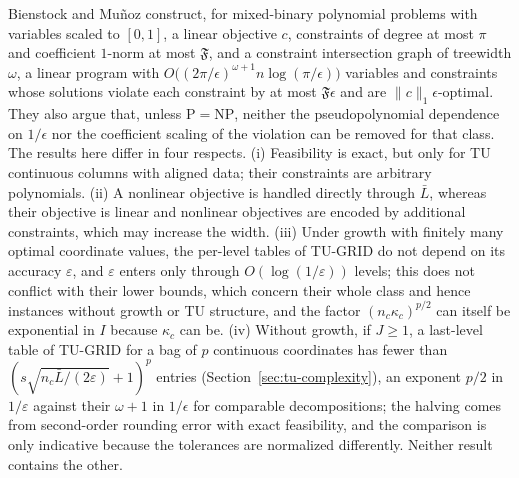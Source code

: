 \begin{remark}\label{rem:tu-bm}
Bienstock and Mu\~noz \cite[Theorems~4 and~15]{BienstockMunoz2018} construct,
for mixed-binary polynomial problems with variables scaled to $[0,1]$, a linear
objective $c$, constraints of degree at most $\pi$ and coefficient $1$-norm at
most $\mathfrak F$, and a constraint intersection graph of treewidth $\omega$, a
linear program with $O\bigl((2\pi/\epsilon)^{\omega+1}n\log(\pi/\epsilon)\bigr)$
variables and constraints whose solutions violate each constraint by at most
$\mathfrak F\epsilon$ and are $\lVert c\rVert_1\epsilon$-optimal. They also argue that,
unless $\mathrm P=\mathrm{NP}$, neither the pseudopolynomial dependence on
$1/\epsilon$ nor the coefficient scaling of the violation can be removed for that
class. The results here differ in four respects. (i) Feasibility is exact, but
only for TU continuous columns with aligned data; their constraints are
arbitrary polynomials. (ii) A nonlinear objective is handled directly through
$\bar L$, whereas their objective is linear and nonlinear objectives are
encoded by additional constraints, which may increase the width. (iii) Under
growth with finitely many optimal coordinate values, the per-level tables of
TU-GRID do not depend on its accuracy $\varepsilon$, and $\varepsilon$ enters
only through $O(\log(1/\varepsilon))$ levels; this does not conflict with
their lower bounds, which concern their whole class and hence instances
without growth or TU structure, and the factor $(n_c\kappa_c)^{p/2}$ can
itself be exponential in $I$ because $\kappa_c$ can be. (iv) Without growth,
if $J\ge1$, a last-level table of TU-GRID for a bag of $p$ continuous
coordinates has fewer than $(s\sqrt{n_c\bar L/(2\varepsilon)}+1)^p$ entries
(Section~\ref{sec:tu-complexity}), an exponent $p/2$ in $1/\varepsilon$
against their $\omega+1$ in $1/\epsilon$ for comparable decompositions; the
halving comes from second-order rounding error with exact feasibility, and
the comparison is only indicative because the tolerances are normalized
differently. Neither result contains the other.
\end{remark}
